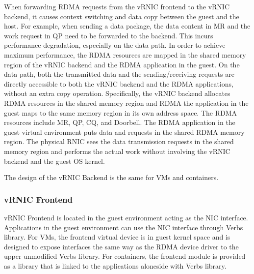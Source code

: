 
When forwarding RDMA requests from the vRNIC frontend to the vRNIC backend, it causes context switching and data copy between the guest and the host. For example, when sending a data package, the data content in MR and the work request in QP need to be forwarded to the backend. This incurs performance degradation, especially on the data path. In order to achieve maximum performance, the RDMA resources are mapped in the shared memory region of the vRNIC backend and the RDMA application in the guest. On the data path, both the transmitted data and the sending/receiving requests are directly accessible to both the vRNIC backend and the RDMA applications, without an extra copy operation. Specifically, the vRNIC backend allocates RDMA resources in the shared memory region and RDMA the application in the guest maps to the same memory region in its own address space. The RDMA resources include MR, QP, CQ, and Doorbell. The RDMA application in the guest virtual environment puts data and requests in the shared RDMA memory region. The physical RNIC sees the data transmission requests in the shared memory region and performs the actual work without involving the vRNIC backend and the guest OS kernel.

The design of the vRNIC Backend is the same for VMs and containers.

\subsubsection{vRNIC Frontend}

vRNIC Frontend is located in the guest environment acting as the NIC interface. Applications in the guest environment can use the NIC interface through Verbs library. For VMs, the frontend virtual device is in guest kernel space and is designed to expose interfaces the same way as the RDMA device driver to the upper unmodified Verbs library. For containers, the frontend module is provided as a library that is linked to the applications aloneside with Verbs library.

